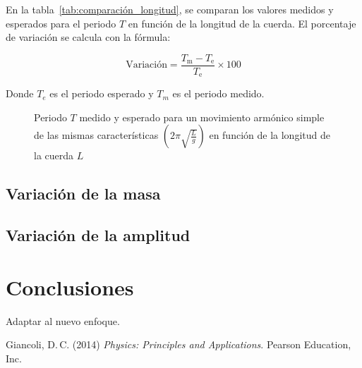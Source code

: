 \documentclass[twocolumn]{report}
\numberwithin{table}{section}
\begin{document}
En la tabla~\ref{tab:comparación_longitud}, se comparan los valores medidos
y esperados para el periodo $T$ en función de la longitud de la
cuerda. El porcentaje de variación se calcula con la fórmula:

\begin{equation}
  \text{Variación} = \frac{T_{\text{m}} - T_{\text{e}}}{T_{\text{e}}} \times 100
\end{equation}

Donde $T_{e}$ es el periodo esperado y $T_{m}$ es el periodo medido.

\begin{figure}[ht]
  \centering
  \caption{Periodo $T$ medido y esperado para un movimiento armónico
    simple de las mismas características
    $\left(2\pi\sqrt{\frac{L}{g}}\right)$ en función de la longitud de
  la cuerda $L$}\label{fig:periodo_mas}
\end{figure}

\subsection{Variación de la masa}

\subsection{Variación de la amplitud}


\section{Conclusiones}

{\color{red} Adaptar al nuevo enfoque.}

\renewcommand{\refname}{Bibliografía}
\begin{thebibliography}{1}
  \bibitem{}
  Giancoli, D.\,C. (2014) \textit{Physics: Principles and
  Applications}. Pearson Education, Inc.
\end{thebibliography}
\end{document}
